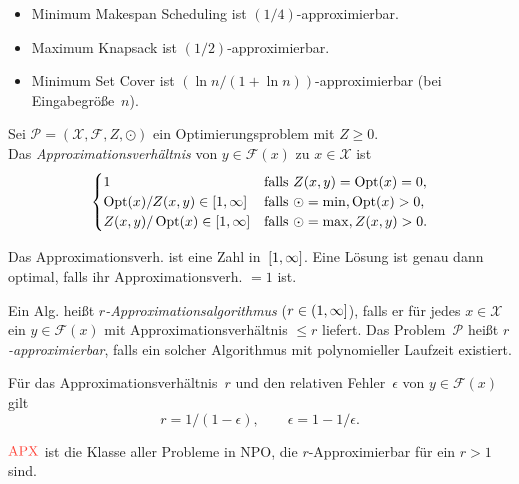 \documentclass{cheat-sheet}
\newcommand{\Instances}{\mathcal{X}} %
\newcommand{\Feasible}{\mathcal{F}} %
\newcommand{\ObjFun}{Z} %
\newcommand{\Goal}{\odot} %
\newcommand{\OptTuple}{(\Instances{}, \Feasible{}, \ObjFun{}, \Goal)} %
\DeclareMathOperator{\Opt}{Opt} %
\DeclareMathOperator{\APX}{APX} %
\newcommand{\Prob}{\mathcal{P}} %
\newcommand{\Defn}[1]{\textcolor{DefinitionColor}{#1}}
\begin{document}
\begin{bspe}
  \begin{itemize}
    \item Minimum Makespan Scheduling ist $(1/4)$-approximierbar.
    \item Maximum Knapsack ist $(1/2)$-approximierbar.
    \item Minimum Set Cover ist $(\ln n / (1 + \ln n))$-approximierbar (bei Eingabegröße~$n$).
  \end{itemize}
\end{bspe}

\begin{defn}
  Sei $\Prob = \OptTuple$ ein Optimierungsproblem mit $Z \geq 0$. \\
  Das \emph{Approximationsverhältnis} von $y \in \Feasible(x)$ zu $x \in \Instances$ ist
  \[
    \begin{cases}
      1 & \text{falls } \ObjFun(x, y) = \Opt(x) = 0, \\
      \Opt(x) / \ObjFun(x, y) \in \cinterval{1}{\infty} & \text{falls } \Goal = \min, \Opt(x) > 0, \\
      \ObjFun(x, y) / \Opt(x) \in \cinterval{1}{\infty} & \text{falls } \Goal = \max, \ObjFun(x, y) > 0.
    \end{cases}
  \]
\end{defn}

\begin{bem}
  Das Approximationsverh. ist eine Zahl in~$\left[ 1, \infty \right]$.
  Eine Lösung ist genau dann optimal, falls ihr Approximationsverh. $= 1$ ist.
\end{bem}

\begin{defn}
  Ein Alg. heißt \emph{$r$-Approximationsalgorithmus} ($r \in \left( 1, \infty \right]$), falls er für jedes $x \in \Instances$ ein $y \in \Feasible(x)$ mit Approximationsverhältnis $\leq r$ liefert.
  Das Problem~$\Prob$ heißt \emph{$r$-approximierbar}, falls ein solcher Algorithmus mit polynomieller Laufzeit existiert.
\end{defn}

\begin{bem}
  Für das Approximationsverhältnis~$r$ und den relativen Fehler~$\epsilon$ von $y \in \Feasible(x)$ gilt
  \[
    r = 1 / (1-\epsilon), \qquad
    \epsilon = 1 - 1/\epsilon.
  \]
\end{bem}

\begin{defn}
  $\Defn{\APX}$ ist die Klasse aller Probleme in NPO, die $r$-Approximierbar für ein $r > 1$ sind.
\end{defn}
\end{document}
